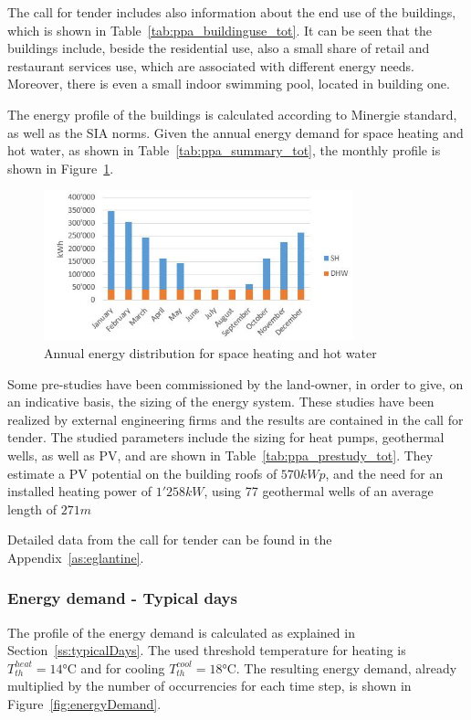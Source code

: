 \documentclass{article}
\begin{document}
The call for tender includes also information about the end use of the buildings, which is shown in Table~\ref{tab:ppa_buildinguse_tot}. It can be seen that the buildings include, beside the residential use, also a small share of retail and restaurant services use, which are associated with different energy needs. Moreover, there is even a small indoor swimming pool, located in building one. 



The energy profile of the buildings is calculated according to Minergie standard, as well as the SIA norms. Given the annual energy demand for space heating and hot water, as shown in Table~\ref{tab:ppa_summary_tot}, the monthly profile is shown in Figure~\ref{fig:ppa_energydemand}.

\begin{figure}[htp]
\centering
\includegraphics[width=0.8\textwidth]{ppa_energydemand.JPG}
\caption{Annual energy distribution for space heating and hot water}
\label{fig:ppa_energydemand}
\end{figure}

Some pre-studies have been commissioned by the land-owner, in order to give, on an indicative basis, the sizing of the energy system. These studies have been realized by external engineering firms and the results are contained in the call for tender. The studied parameters include the sizing for heat pumps, geothermal wells, as well as PV, and are shown in Table~\ref{tab:ppa_prestudy_tot}. They estimate a PV potential on the building roofs of $570 kWp$, and the need for an installed heating power of $1'258 kW$, using 77 geothermal wells of an average length of $271 m$



Detailed data from the call for tender can be found in the Appendix~\ref{as:eglantine}.

\subsubsection{Energy demand - Typical days}
The profile of the energy demand is calculated as explained in Section~\ref{ss:typicalDays}. The used threshold temperature for heating is $T_{th}^{heat} = 14\si{\celsius}$ and for cooling $T_{th}^{cool} = 18 \si{\celsius}$. The resulting energy demand, already multiplied by the number of occurrencies for each time step, is shown in Figure~\ref{fig:energyDemand}.
\end{document}
